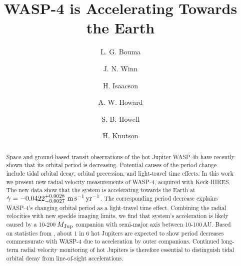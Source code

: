 \documentclass[12pt,twocolumn,tighten]{aastex62}
\begin{document}

\title{WASP-4 is Accelerating Towards the Earth}


%
%
\author[0000-0002-0514-5538]{L. G. Bouma}
%
\author[0000-0002-4265-047X]{J. N. Winn}

%
%
\author[0000-0002-0531-1073]{H. Isaacson}
%
\author[0000-0001-8638-0320]{A. W. Howard}
%
\author{S. B. Howell}
%
\author{H. Knutson}
%
%
%

\begin{abstract}
  Space and ground-based transit observations of the hot Jupiter
  WASP-4b have recently shown that its orbital period is decreasing.
  Potential causes of the period change include tidal orbital decay,
  orbital precession, and light-travel time effects.
  In this work we present new radial velocity measurements of WASP-4,
  acquired with Keck-HIRES.
  The new data show that the system is accelerating towards the Earth
  at $\dot{\gamma} = -0.0422^{+0.0028}_{-0.0027}\ {\rm m}\,{\rm
  s}^{-1}\,{\rm yr}^{-1}$.
  The corresponding period decrease explains WASP-4's
  changing orbital period as a light-travel time effect.
  Combining the radial velocities with new speckle imaging limits, we
  find that system's acceleration is likely caused by a
  10-200$\,M_{\rm Jup}$ companion with semi-major axis between 10-100$\,$AU.
  Based on statistics from \citet{knutson_friends_2014}, about 1 in 6
  hot Jupiters are expected to show period decreases commensurate with
  WASP-4 due to acceleration by outer companions.
  Continued long-term radial velocity monitoring of hot Jupiters is
  therefore essential to distinguish tidal orbital decay from
  line-of-sight accelerations.
\end{abstract}
\end{document}
